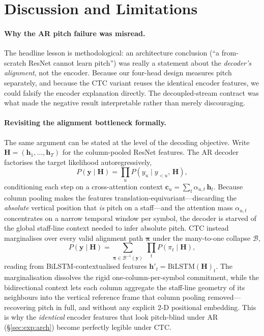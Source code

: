 \section{Discussion and Limitations}
\label{section:discussion}

\paragraph{Why the AR pitch failure was misread.} The headline lesson is
methodological: an architecture conclusion (``a from-scratch ResNet cannot learn
pitch'') was really a statement about the \emph{decoder's alignment}, not the
encoder. Because our four-head design measures pitch separately, and because the
CTC variant reuses the identical encoder features, we could falsify the encoder
explanation directly. The decoupled-stream contract was what made the negative
result interpretable rather than merely discouraging.

\paragraph{Revisiting the alignment bottleneck formally.} The same argument can be
stated at the level of the decoding objective. Write
$\mathbf{H}=(\mathbf{h}_1,\dots,\mathbf{h}_T)$ for the column-pooled ResNet
features. The AR decoder factorises the target likelihood autoregressively,
\begin{equation*}
  P(\mathbf{y}\mid\mathbf{H})=\prod_{u} P\!\left(y_u \mid y_{<u},\,\mathbf{H}\right),
\end{equation*}
conditioning each step on a cross-attention context
$\mathbf{c}_u=\sum_{t}\alpha_{u,t}\,\mathbf{h}_t$. Because column pooling makes the
features translation-equivariant---discarding the \emph{absolute} vertical position
that \emph{is} pitch on a staff---and the attention mass $\alpha_{u,t}$ concentrates
on a narrow temporal window per symbol, the decoder is starved of the global
staff-line context needed to infer absolute pitch. CTC instead marginalises over
every valid alignment path $\boldsymbol{\pi}$ under the many-to-one collapse
$\mathcal{B}$,
\begin{equation*}
  P(\mathbf{y}\mid\mathbf{H})=\!\!\!\sum_{\boldsymbol{\pi}\in\mathcal{B}^{-1}(\mathbf{y})}\ \prod_{t} P\!\left(\pi_t \mid \mathbf{H}\right),
\end{equation*}
reading from BiLSTM-contextualised features
$\mathbf{h}'_t=\mathrm{BiLSTM}(\mathbf{H})_t$. The marginalisation dissolves the
rigid one-column-per-symbol commitment, while the bidirectional context lets each
column aggregate the staff-line geometry of its neighbours into the vertical
reference frame that column pooling removed---recovering pitch in full, and without
any explicit 2-D positional embedding. This is why the \emph{identical} encoder
features that look pitch-blind under AR (\S\ref{sec:exp:arch}) become perfectly
legible under CTC.

